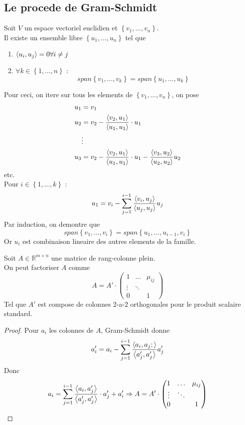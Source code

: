 \documentclass[../main.tex]{subfiles}
\begin{document}
\subsection*{Le procede de Gram-Schmidt}
Soit $V$ un espace vectoriel euclidien  et  $\left\{ v_1, \ldots, v_n \right\}$.\\
Il existe un ensemble libre  $ \left\{ u_1, \ldots, u_n \right\}  $ tel que
\begin{enumerate}
\item $\left\langle u_i, u_j\right\rangle =0 \forall i \neq j$ 
\item $\forall k \in \left\{ 1, \ldots, n \right\} $ :
	\[ 
		span \left\{ v_1, \ldots, v_k \right\} = span \left\{ u_1, \ldots, u_k \right\} 
	\]
	
\end{enumerate}
Pour ceci, on itere sur tous les elements de $ \left\{ v_1, \ldots, v_n \right\} $, on pose
\begin{align*}
	u_1&= v_1\\
	u_2 &= v_2 - \frac{\left\langle v_2,u_1\right\rangle }{\left\langle u_1,u_1\right\rangle } \cdot u_1\\
	    & \vdots\\
	u_3 &= v_2 - \frac{\left\langle v_2, u_1\right\rangle }{\left\langle u_1,u_1\right\rangle }\cdot u_1 - \frac{\left\langle  v_3,u_2\right\rangle}{\left\langle u_2,u_2\right\rangle } u_2	
\end{align*}
etc.\\
Pour $i \in \left\{ 1, \ldots, k \right\} $ :
\[ 
u_1 = v_i - \sum_{j=1}^{ i-1} \frac{\left\langle v_i,u_j\right\rangle }{\left\langle u_j,u_j\right\rangle } u_j
\]
Par induction, on demontre que
	\[ 
		span \left\{ v_1, \ldots, v_i \right\} = span \left\{ u_1, \ldots, u_{i-1} , v_i \right\} 
	\]
Or $u_i$ est combinaison lineaire des autres elements de la famille.
\begin{crly}
Soit $A \in \mathbb{R}^{m \times n}$ une matrice de rang-colonne plein.\\
On peut factoriser $A$ comme
\[ 
A = A' \cdot
\begin{pmatrix}
	1 & \ldots & \mu_{ij} \\
	\vdots & \ddots &\\
	0 & & 1
\end{pmatrix}
\]
Tel que $A'$ est compose de colonnes 2-a-2 orthogonales pour le produit scalaire standard.

\end{crly}
\begin{proof}
	Pour $a_i$ les colonnes de $A$, Gram-Schmidt donne 
\[ 
a_{i} ' = a_i - \sum_{j=1}^{ i-1} \frac{\left\langle a_i, a_j;\right\rangle }{\left\langle a_j ', a_j'\right\rangle }a_j '
\]
Donc
\begin{align*}
a_i = \sum_{j=1}^{ i-1} \frac{\left\langle a_i, a_j'\right\rangle }{\left\langle a_j', a_j'\right\rangle }\cdot a_j' + a_i' \Rightarrow A = A' \cdot 
\begin{pmatrix}
	1 & \ldots & \mu_{ij} \\
	\vdots & \ddots &\\
	0 & & 1
\end{pmatrix}
\end{align*}


\end{proof}




					
\end{document}
